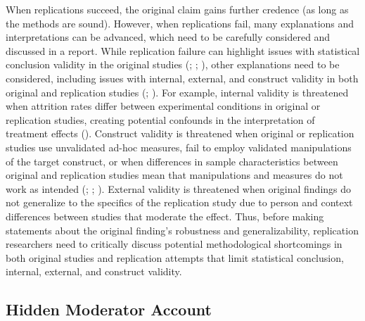 \documentclass[
  letterpaper,
  DIV=11,
  openany,
  fontsize=12pt,
  parskip=half,
  headings=big,
  numbers=noenddot,
  titlepage=false]{scrreprt}
\begin{document}
When replications succeed, the original claim gains further credence (as
long as the methods are sound). However, when replications fail, many
explanations and interpretations can be advanced, which need to be
carefully considered and discussed in a report. While replication
failure can highlight issues with statistical conclusion validity in the
original studies (; ; ), other explanations need to be considered, including
issues with internal, external, and construct validity in both original
and replication studies (; ). For example, internal validity is
threatened when attrition rates differ between experimental conditions
in original or replication studies, creating potential confounds in the
interpretation of treatment effects (). Construct validity is threatened when original
or replication studies use unvalidated ad-hoc measures, fail to employ
validated manipulations of the target construct, or when differences in
sample characteristics between original and replication studies mean
that manipulations and measures do not work as intended
(;
;
). External validity
is threatened when original findings do not generalize to the specifics
of the replication study due to person and context differences between
studies that moderate the effect. Thus, before making statements about
the original finding's robustness and generalizability, replication
researchers need to critically discuss potential methodological
shortcomings in both original studies and replication attempts that
limit statistical conclusion, internal, external, and construct
validity.

\subsection{Hidden Moderator Account}\label{hidden-moderator-account}
\end{document}
